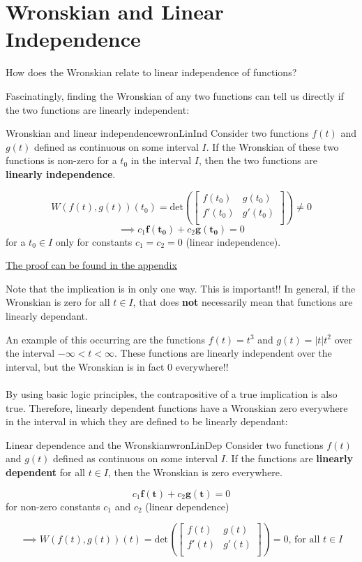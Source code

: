 \documentclass{report}
\begin{document}
\section{Wronskian and Linear Independence}
How does the Wronskian relate to linear independence of functions?

Fascinatingly, finding the Wronskian of any two functions can tell us directly if the two functions are linearly independent:

\begin{mytheo}{Wronskian and linear independence}{wronLinInd}
    Consider two functions $f(t)$ and $g(t)$ defined as continuous on some interval $I$. If the Wronskian of these two functions is non-zero for a $t_0$ in the interval $I$, then the two functions are \textbf{linearly independence}. 
    
    $$W(f(t),g(t))(t_0) = \text{det}\left(\begin{bmatrix}
    f(t_0) & g(t_0) \\
    f'(t_0) & g'(t_0) \\
    \end{bmatrix}\right)
    \neq 0 $$
    $$\implies c_1\bm{f(t_0)} + c_2\bm{g(t_0)} = 0$$ 
    for a $t_0 \in I$ only for constants $c_1=c_2=0$ (linear independence).
\end{mytheo}
  
\hyperref[sec:prWronLinInd]{The proof can be found in the appendix}


Note that the implication is in only one way. This is important!! In general, if the Wronskian is zero for all $t \in I$, that does \textbf{not} necessarily mean that functions are linearly dependant. 
    
An example of this occurring are the functions $f(t) = t^3$ and $g(t) = |t|t^2$ over the interval $-\infty < t < \infty$. These functions are linearly independent over the interval, but the Wronskian is in fact 0 everywhere!!
\\ \\
By using basic logic principles, the contrapositive of a true implication is also true. Therefore, linearly dependent functions have a Wronskian zero everywhere in the interval in which they are defined to be linearly dependant:
    
\begin{mytheo}{Linear dependence and the Wronskian}{wronLinDep}
    Consider two functions $f(t)$ and $g(t)$ defined as continuous on some interval $I$. If the functions are \textbf{linearly dependent} for all $t \in I$, then the Wronskian is zero everywhere.
    
    $$c_1\bm{f(t)} + c_2\bm{g(t)} = 0$$ 
    for non-zero constants $c_1$ and $c_2$ (linear dependence)
    
    $$ \implies W(f(t),g(t))(t) = \text{det}\left(\begin{bmatrix}
    f(t) & g(t) \\
    f'(t) & g'(t) \\
    \end{bmatrix}\right)
    = 0 \text{, for all $t \in I$}$$
\end{mytheo}
\end{document}
